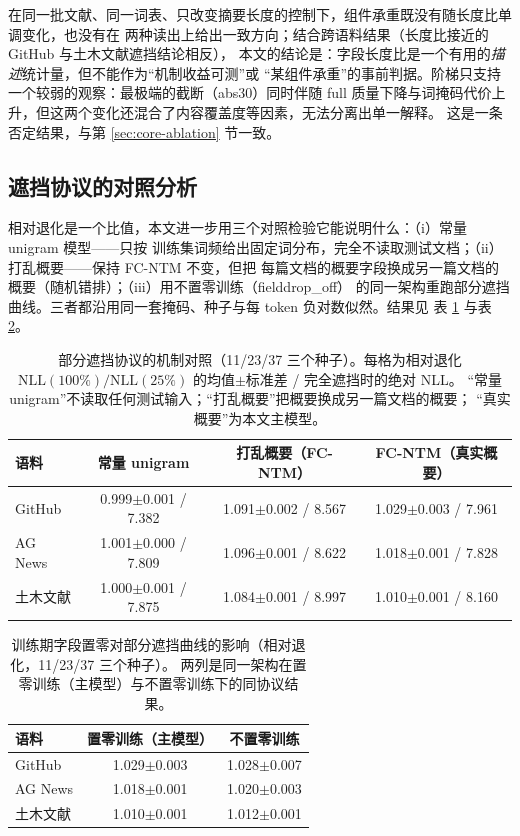 \documentclass[11pt]{ctexart}
\newcommand{\fcntm}{FC-NTM}
\begin{document}
在同一批文献、同一词表、只改变摘要长度的控制下，组件承重既没有随长度比单调变化，也没有在
两种读出上给出一致方向；结合跨语料结果（长度比接近的 GitHub 与土木文献遮挡结论相反），
本文的结论是：字段长度比是一个有用的\emph{描述}统计量，但不能作为“机制收益可测”或
“某组件承重”的事前判据。阶梯只支持一个较弱的观察：最极端的截断（abs30）同时伴随 full
质量下降与词掩码代价上升，但这两个变化还混合了内容覆盖度等因素，无法分离出单一解释。
这是一条否定结果，与第 \ref{sec:core-ablation} 节一致。

\subsection{遮挡协议的对照分析}
\label{sec:occl-controls}

相对退化是一个比值，本文进一步用三个对照检验它能说明什么：（i）常量 unigram 模型——只按
训练集词频给出固定词分布，完全不读取测试文档；（ii）打乱概要——保持 \fcntm{} 不变，但把
每篇文档的概要字段换成另一篇文档的概要（随机错排）；（iii）用不置零训练（fielddrop\_off）
的同一架构重跑部分遮挡曲线。三者都沿用同一套掩码、种子与每 token 负对数似然。结果见
表 \ref{tab:occl-controls} 与表 \ref{tab:fielddrop-control}。

\begin{table}[t]
\centering
\caption{部分遮挡协议的机制对照（11/23/37 三个种子）。每格为相对退化
$\mathrm{NLL}(100\%)/\mathrm{NLL}(25\%)$ 的均值$\pm$标准差 / 完全遮挡时的绝对 NLL。
“常量 unigram”不读取任何测试输入；“打乱概要”把概要换成另一篇文档的概要；
“真实概要”为本文主模型。}
\label{tab:occl-controls}
\small
\setlength{\tabcolsep}{4pt}
\begin{tabular}{@{}lccc@{}}
\toprule
语料 & 常量 unigram & 打乱概要（\fcntm{}） & \fcntm{}（真实概要） \\
\midrule
GitHub & 0.999$\pm$0.001 / 7.382 & 1.091$\pm$0.002 / 8.567 & 1.029$\pm$0.003 / 7.961 \\
AG News & 1.001$\pm$0.000 / 7.809 & 1.096$\pm$0.001 / 8.622 & 1.018$\pm$0.001 / 7.828 \\
土木文献 & 1.000$\pm$0.001 / 7.875 & 1.084$\pm$0.001 / 8.997 & 1.010$\pm$0.001 / 8.160 \\
\bottomrule
\end{tabular}
\end{table}

\begin{table}[t]
\centering
\caption{训练期字段置零对部分遮挡曲线的影响（相对退化，11/23/37 三个种子）。
两列是同一架构在置零训练（主模型）与不置零训练下的同协议结果。}
\label{tab:fielddrop-control}
\small
\setlength{\tabcolsep}{4pt}
\begin{tabular}{@{}lcc@{}}
\toprule
语料 & 置零训练（主模型） & 不置零训练 \\
\midrule
GitHub & 1.029$\pm$0.003 & 1.028$\pm$0.007 \\
AG News & 1.018$\pm$0.001 & 1.020$\pm$0.003 \\
土木文献 & 1.010$\pm$0.001 & 1.012$\pm$0.001 \\
\bottomrule
\end{tabular}
\end{table}
\end{document}
